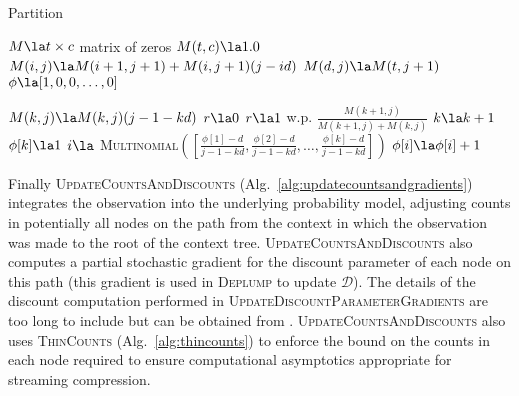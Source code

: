 \begin{algorithm}[t!]
	\caption{Partition} \label{alg:samplepartition}
	\begin{algorithmic}[1]
	
		\State $M \la  t \times c$ matrix of zeros
		\State $M(t,c) \la 1.0$
				\State $M(i,j) \la M(i +1, j+1) + M(i,j+1)(j - id)$ 
			\EndFor
			\State $M(d,j) \la M(t,j+1)$
		\EndFor
		\State $\phi \la [1,0,0,\ldots, 0]$ 
		
			\State $M(k,j) \la M(k,j)(j-1 -k d)$
			\State $r \la 0$
			\State $r \la 1 $ w.p. $\frac{M(k+1,j)}{M(k+1,j) + M(k,j)}$
				\State $k \la k + 1$
				\State $\phi[k]  \la 1$
			\Else
				\State $i \la$ \textsc{Multinomial}$([\frac{\phi[1] - d}{j-1 -kd}, \frac{\phi[2] - d}{j-1 -kd}, \ldots, \frac{\phi[k] - d}{j-1 -kd}])$
				\State $\phi[i] \la \phi[i] + 1$
			\EndIf
		\EndFor
	\EndFunction
		\end{algorithmic}
\end{algorithm}

Finally \textsc{UpdateCountsAndDiscounts} (Alg.~\ref{alg:updatecountsandgradients}) integrates the observation into the underlying probability model, adjusting counts in potentially all nodes on the path from the context in which the observation was made to the root of the context tree.   \textsc{UpdateCountsAndDiscounts} also computes a partial stochastic gradient for the discount parameter of each node on this path (this gradient is used in \textsc{Deplump} to update $\mathcal{D}$).  The details of the discount computation performed in \textsc{UpdateDiscountParameterGradients} are too long to include but can be obtained from \cite{Gasthaus2010}.  \textsc{UpdateCountsAndDiscounts} also uses \textsc{ThinCounts} (Alg.~\ref{alg:thincounts}) to enforce the bound on the counts in each node required to ensure computational asymptotics appropriate for streaming compression. 



